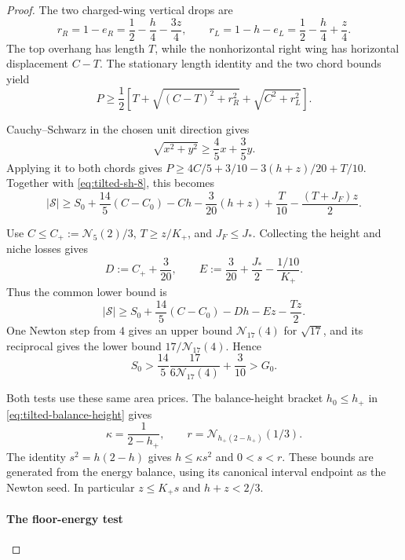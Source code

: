 \begin{proof}
The two charged-wing vertical drops are
\[
 r_R=1-e_R=\frac12-\frac h4-\frac{3z}{4},\qquad
 r_L=1-h-e_L=\frac12-\frac h4+\frac z4.
\]
The top overhang has length $T$, while the nonhorizontal right wing
has horizontal displacement $C-T$. The stationary length identity
and the two chord bounds yield
\begin{equation}\label{eq:tilted-sh-10}
 P\ge\frac12\left[T+
 \sqrt{(C-T)^2+r_R^2}+\sqrt{C^2+r_L^2}\right].
\end{equation}

Cauchy--Schwarz in the chosen unit direction gives
\[
 \sqrt{x^2+y^2}\ge\frac45x+\frac35y.
\]
Applying it to both chords gives
$P\ge4C/5+3/10-3(h+z)/20+T/10$.
Together with \eqref{eq:tilted-sh-8}, this becomes
\begin{equation}\label{eq:tilted-sh-11}
 |\mathcal S|\ge S_0+\frac{14}{5}(C-C_0)
 -Ch-\frac3{20}(h+z)+\frac T{10}-\frac{(T+J_F)z}{2}.
\end{equation}

Use $C\le C_+:=\mathcal N_5(2)/3$, $T\ge z/K_+$, and $J_F\le J_*$.
Collecting the height and niche losses gives
\begin{equation}\label{eq:tilted-sh-12}
 D:=C_++\frac3{20},\qquad
 E:=\frac3{20}+\frac{J_*}{2}-\frac{1/10}{K_+}.
\end{equation}
Thus the common lower bound is
\begin{equation}\label{eq:tilted-sh-13}
 |\mathcal S|\ge S_0+\frac{14}{5}(C-C_0)
 -Dh-Ez-\frac{Tz}{2}.
\end{equation}
One Newton step from $4$ gives an upper bound
$\mathcal N_{17}(4)$ for $\sqrt{17}$, and its reciprocal gives
the lower bound $17/\mathcal N_{17}(4)$. Hence
\begin{equation}\label{eq:tilted-sh-14}
 S_0>\frac{14}{5}\frac{17}{6\mathcal N_{17}(4)}+\frac3{10}
     >G_0.
\end{equation}

Both tests use these same area prices. The balance-height bracket
$h_0\le h_+$ in \eqref{eq:tilted-balance-height} gives
\[
 \kappa=\frac1{2-h_+},\qquad
 r=\mathcal N_{h_+(2-h_+)}(1/3).
\]
The identity $s^2=h(2-h)$ gives $h\le\kappa s^2$ and $0<s<r$.
These bounds are generated from the energy balance, using its canonical interval
endpoint as the Newton seed. In particular $z\le K_+s$
and $h+z<2/3$.

\paragraph{The floor-energy test}


\end{proof}
